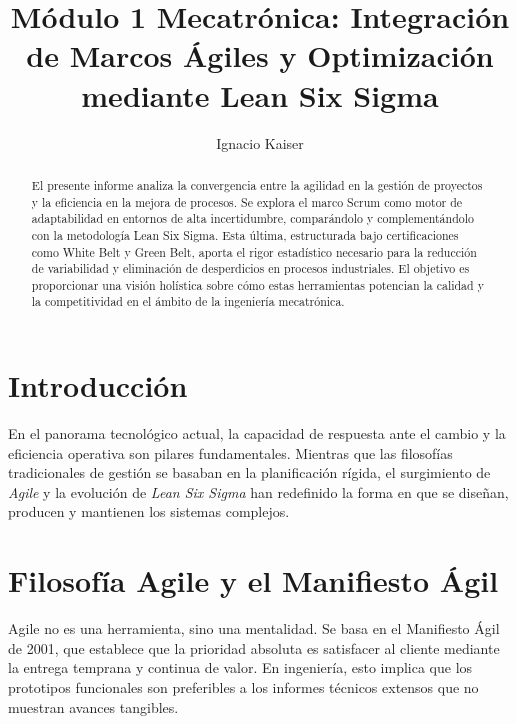 \documentclass[runningheads]{llncs}
\begin{document}
\title{Módulo 1 Mecatrónica: Integración de Marcos Ágiles y Optimización mediante Lean Six Sigma}

\author{Ignacio Kaiser\orcidID{ }}



\maketitle

\begin{abstract}
El presente informe analiza la convergencia entre la agilidad en la gestión de proyectos y la eficiencia en la mejora de procesos. Se explora el marco Scrum como motor de adaptabilidad en entornos de alta incertidumbre, comparándolo y complementándolo con la metodología Lean Six Sigma. Esta última, estructurada bajo certificaciones como White Belt y Green Belt, aporta el rigor estadístico necesario para la reducción de variabilidad y eliminación de desperdicios en procesos industriales. El objetivo es proporcionar una visión holística sobre cómo estas herramientas potencian la calidad y la competitividad en el ámbito de la ingeniería mecatrónica.

\end{abstract}

\section{Introducción}
En el panorama tecnológico actual, la capacidad de respuesta ante el cambio y la eficiencia operativa son pilares fundamentales. Mientras que las filosofías tradicionales de gestión se basaban en la planificación rígida, el surgimiento de \textit{Agile} y la evolución de \textit{Lean Six Sigma} han redefinido la forma en que se diseñan, producen y mantienen los sistemas complejos.

\section{Filosofía Agile y el Manifiesto Ágil}
Agile no es una herramienta, sino una mentalidad. Se basa en el Manifiesto Ágil de 2001, que establece que la prioridad absoluta es satisfacer al cliente mediante la entrega temprana y continua de valor. En ingeniería, esto implica que los prototipos funcionales son preferibles a los informes técnicos extensos que no muestran avances tangibles.
\end{document}
